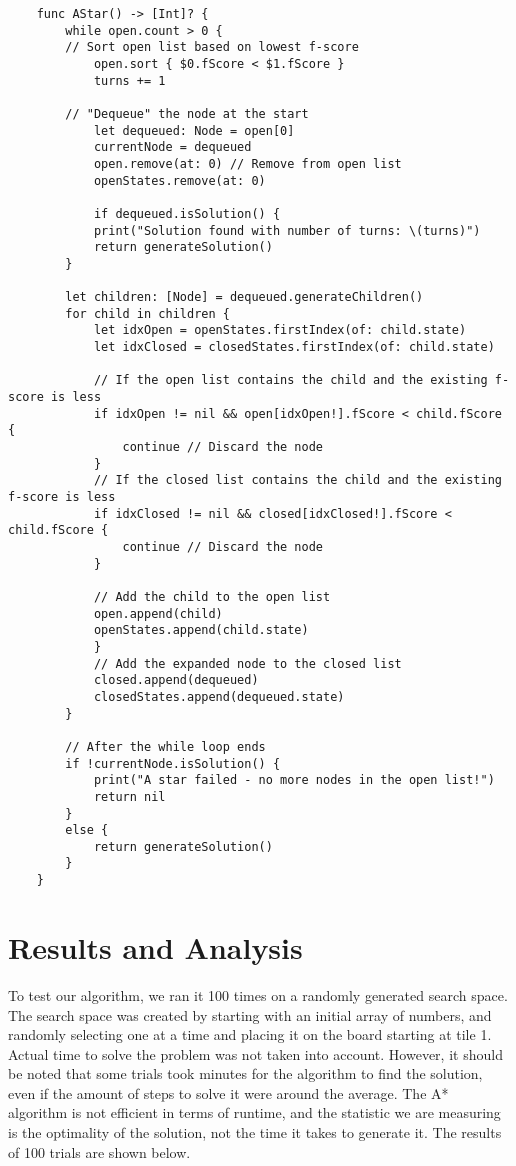 \documentclass[titlepage]{article}
\begin{document}
\vspace{6mm}
\begin{lstlisting}
	func AStar() -> [Int]? {
		while open.count > 0 {
		// Sort open list based on lowest f-score
			open.sort { $0.fScore < $1.fScore }
			turns += 1
		
		// "Dequeue" the node at the start
			let dequeued: Node = open[0]
			currentNode = dequeued
			open.remove(at: 0) // Remove from open list
			openStates.remove(at: 0)
		
			if dequeued.isSolution() {
			print("Solution found with number of turns: \(turns)")
			return generateSolution()
		}
		
		let children: [Node] = dequeued.generateChildren()
		for child in children {
			let idxOpen = openStates.firstIndex(of: child.state)
			let idxClosed = closedStates.firstIndex(of: child.state)
		
			// If the open list contains the child and the existing f-score is less
			if idxOpen != nil && open[idxOpen!].fScore < child.fScore {
				continue // Discard the node
			}
			// If the closed list contains the child and the existing f-score is less
			if idxClosed != nil && closed[idxClosed!].fScore < child.fScore {
				continue // Discard the node
			}
		
			// Add the child to the open list
			open.append(child)
			openStates.append(child.state)
			}
			// Add the expanded node to the closed list
			closed.append(dequeued)
			closedStates.append(dequeued.state)
		}
		
		// After the while loop ends
		if !currentNode.isSolution() {
			print("A star failed - no more nodes in the open list!")
			return nil
		}
		else {
			return generateSolution()
		}
	}
\end{lstlisting}
\newpage

\section{Results and Analysis}
To test our algorithm, we ran it 100 times on a randomly generated search space. The search space was created by starting with an initial array of numbers, and randomly selecting one at a time and placing it on the board starting at tile 1. Actual time to solve the problem was not taken into account. However, it should be noted that some trials took minutes for the algorithm to find the solution, even if the amount of steps to solve it were around the average. The A* algorithm is not efficient in terms of runtime, and the statistic we are measuring is the optimality of the solution, not the time it takes to generate it. The results of 100 trials are shown below.
\end{document}
